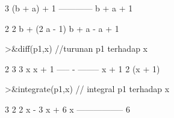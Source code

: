 \documentclass[a4paper,10pt]{article}
\begin{document}
\begin{eulernotebook}
\begin{euleroutput}
                                      3
                               (b + a)  + 1
                               ------------
                                b + a + 1
  
  
                       2                  2
                      b  + (2 a - 1) b + a  - a + 1
  
\end{euleroutput}
\begin{eulerprompt}
>&diff(p1,x) //turunan p1 terhadap x
\end{eulerprompt}
\begin{euleroutput}
  
                                2      3
                             3 x      x  + 1
                             ----- - --------
                             x + 1          2
                                     (x + 1)
  
\end{euleroutput}
\begin{eulerprompt}
>&integrate(p1,x) // integral p1 terhadap x
\end{eulerprompt}
\begin{euleroutput}
  
                               3      2
                            2 x  - 3 x  + 6 x
                            -----------------
                                    6
  

\end{euleroutput}
\end{eulernotebook}
\end{document}
